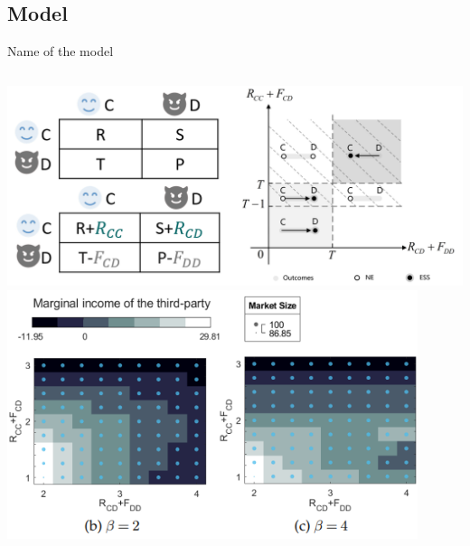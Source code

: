 \documentclass[compress]{beamer}
\begin{document}
\subsection{Model}
\begin{frame}{Name of the model\cite{zhou2022costly}}
    \begin{columns}[c]
    
        \begin{column}{.5\textwidth}
            \centering
            \includegraphics[width=\textwidth]{ProperIncentAnaModel.png}\\[0.5cm]
            \includegraphics[width=0.9\textwidth]{ProperIncentExpResult.png}\\[0.5cm]
        \end{column}
    

\end{columns}
\end{frame}
\end{document}
